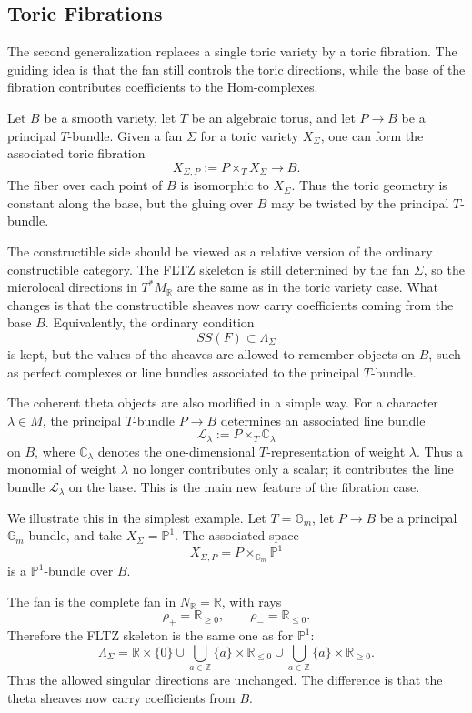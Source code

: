 \subsection{Toric Fibrations}


The second generalization replaces a single toric variety by a toric fibration.
The guiding idea is that the fan still controls the toric directions, while
the base of the fibration contributes coefficients to the Hom-complexes.

Let \(B\) be a smooth variety, let \(T\) be an algebraic torus, and let
\(P\to B\) be a principal \(T\)-bundle. Given a fan \(\Sigma\) for a toric
variety \(X_\Sigma\), one can form the associated toric fibration
\[
X_{\Sigma,P}:=P\times_T X_\Sigma \longrightarrow B.
\]
The fiber over each point of \(B\) is isomorphic to \(X_\Sigma\). Thus the
toric geometry is constant along the base, but the gluing over \(B\) may be
twisted by the principal \(T\)-bundle.

The constructible side should be viewed as a relative version of the ordinary
constructible category. The FLTZ skeleton is still determined by the fan
\(\Sigma\), so the microlocal directions in \(T^*M_{\mathbb R}\) are the same
as in the toric variety case. What changes is that the constructible sheaves
now carry coefficients coming from the base \(B\). Equivalently, the ordinary
condition
\[
SS(F)\subset \Lambda_\Sigma
\]
is kept, but the values of the sheaves are allowed to remember objects on
\(B\), such as perfect complexes or line bundles associated to the principal
\(T\)-bundle.

The coherent theta objects are also modified in a simple way. For a character
\(\lambda\in M\), the principal \(T\)-bundle \(P\to B\) determines an associated
line bundle
\[
\mathcal L_\lambda:=P\times_T \mathbb C_\lambda
\]
on \(B\), where \(\mathbb C_\lambda\) denotes the one-dimensional
\(T\)-representation of weight \(\lambda\). Thus a monomial of weight
\(\lambda\) no longer contributes only a scalar; it contributes the line bundle
\(\mathcal L_\lambda\) on the base. This is the main new feature of the
fibration case.

We illustrate this in the simplest example. Let \(T=\mathbb G_m\), let
\(P\to B\) be a principal \(\mathbb G_m\)-bundle, and take \(X_\Sigma=\mathbb P^1\).
The associated space
\[
X_{\Sigma,P}=P\times_{\mathbb G_m}\mathbb P^1
\]
is a \(\mathbb P^1\)-bundle over \(B\).

The fan is the complete fan in \(N_{\mathbb R}=\mathbb R\), with rays
\[
\rho_+=\mathbb R_{\ge 0},
\qquad
\rho_-=\mathbb R_{\le 0}.
\]
Therefore the FLTZ skeleton is the same one as for \(\mathbb P^1\):
\[
\Lambda_\Sigma
=
\mathbb R\times\{0\}
\cup
\bigcup_{a\in\mathbb Z}\{a\}\times\mathbb R_{\le 0}
\cup
\bigcup_{a\in\mathbb Z}\{a\}\times\mathbb R_{\ge 0}.
\]
Thus the allowed singular directions are unchanged. The difference is that the
theta sheaves now carry coefficients from \(B\).

